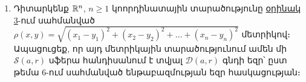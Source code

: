 \begin{enumerate}[label=\thesection.\arabic*.]
\item Դիտարկենք $\mathbb{R}^n$, $n \ge 1$ կոորդինատային տարածությունը \hyperref[ch7ex3]{օրինակ 3}-ում \linebreak սահ\-մանված $\rho(x,y) = \sqrt{(x_1-y_1)^2+(x_2-y_2)^2+\dots+(x_n-y_n)^2}$ մետրիկով։ Ապացուցեք, որ այդ մետրիկային տարածությունում ամեն մի $\mathcal{S}(a, r)$ սֆերա հանդիսանում է տվյալ $\mathcal{D}(a, r)$ գնդի եզր՝ ըստ թեմա 6-ում սահմանված ենթա\-բազմության եզր հասկացության։

\end{enumerate}
